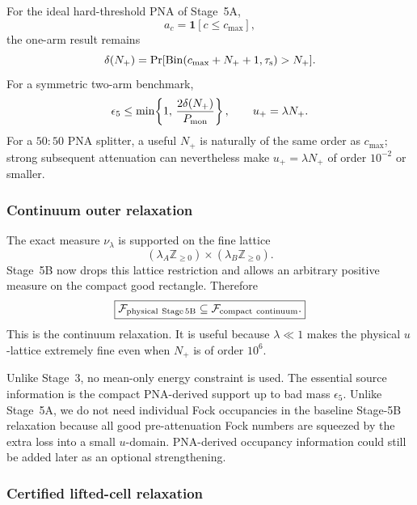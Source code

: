 \documentclass[11pt]{article}
\theoremstyle{remark}
\begin{document}
For the ideal hard-threshold PNA of Stage~5A,
\[
    a_c=\mathbf 1[c\le c_{\max}],
\]
the one-arm result remains
\begin{equation}
    \delta(N_+)
    =
    \Pr[
      \operatorname{Bin}
      (c_{\max}+N_++1,\tau_{\rm s})
      >
      N_+
    ].
    \label{eq:stage5b-ideal-delta}
\end{equation}
For a symmetric two-arm benchmark,
\begin{equation}
    \epsilon_5
    \le
    \min\!\left\{
      1,\,
      \frac{
        2\delta(N_+)
      }{
        P_{\rm mon}
      }
    \right\},
    \qquad
    u_+=\lambda N_+.
    \label{eq:stage5b-ideal-interface}
\end{equation}
For a \(50{:}50\) PNA splitter, a useful \(N_+\) is naturally of the same
order as \(c_{\max}\); strong subsequent attenuation can nevertheless make
\(u_+=\lambda N_+\) of order \(10^{-2}\) or smaller.

\subsubsection{Continuum outer relaxation}

The exact measure \(\nu_\lambda\) is supported on the fine lattice
\[
    (\lambda_A\mathbb Z_{\ge0})
    \times
    (\lambda_B\mathbb Z_{\ge0}).
\]
Stage~5B now drops this lattice restriction and allows an arbitrary positive
measure on the compact good rectangle.  Therefore
\begin{equation}
    \boxed{
    \mathcal F_{\rm physical\ Stage\,5B}
    \subseteq
    \mathcal F_{\rm compact\ continuum}.
    }
    \label{eq:stage5b-continuum-inclusion}
\end{equation}
This is the continuum relaxation.  It is useful because \(\lambda\ll1\)
makes the physical \(u\)-lattice extremely fine even when \(N_+\) is of order
\(10^6\).

Unlike Stage~3, no mean-only energy constraint is used.  The essential source
information is the compact PNA-derived support up to bad mass \(\epsilon_5\).
Unlike Stage~5A, we do not need individual Fock occupancies in the baseline
Stage-5B relaxation because all good pre-attenuation Fock numbers are squeezed
by the extra loss into a small \(u\)-domain.  PNA-derived occupancy information
could still be added later as an optional strengthening.

\subsubsection{Certified lifted-cell relaxation}
\end{document}

